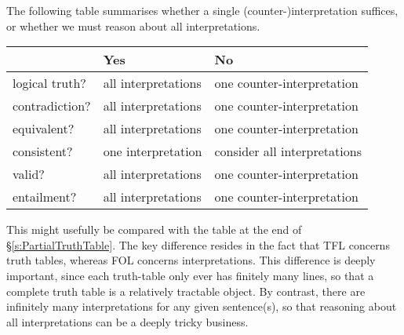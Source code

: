 The following table summarises whether a single (counter-)interpretation suffices, or whether we must reason about all interpretations.


\begin{center}
\begin{tabular}{l l l}
 & \textbf{Yes} & \textbf{No}\\
 \hline
logical truth? & all interpretations & one counter-interpretation\\
contradiction? &  all interpretations  & one counter-interpretation\\
equivalent? & all interpretations & one counter-interpretation\\
consistent? & one interpretation & consider all interpretations\\
valid? & all interpretations & one counter-interpretation\\
entailment? & all interpretations & one counter-interpretation\\
\end{tabular}
\end{center}
\label{table.ModelOrArgument}

This might usefully be compared with the table at the end of \S\ref{s:PartialTruthTable}. The key difference resides in the fact that TFL concerns truth tables, whereas FOL concerns interpretations. This difference is deeply important, since each truth-table only ever has finitely many lines, so that a complete truth table is a relatively tractable object. By contrast, there are infinitely many interpretations for any given sentence(s), so that reasoning about all interpretations can be a deeply tricky business. 
